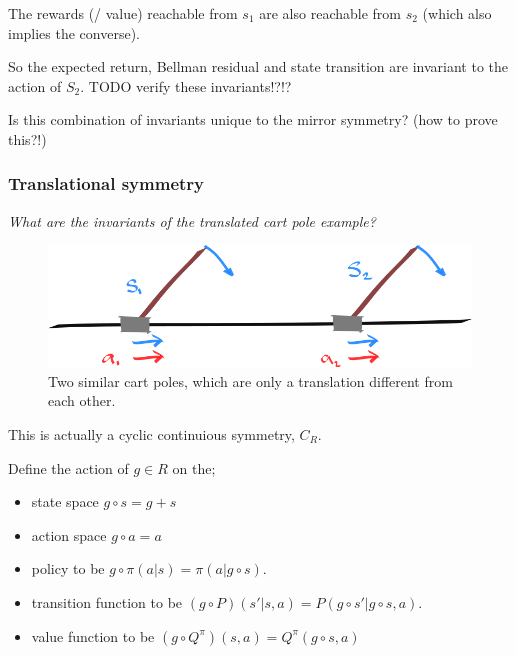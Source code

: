 The rewards (/ value) reachable from $s_1$ are also reachable from $s_2$ (which also implies the converse).

So the expected return, Bellman residual and state transition are invariant to the action of $S_2$.
{\color{red}TODO verify these invariants!?!?}

Is this combination of invariants unique to the mirror symmetry? (how to prove this?!)

\subsubsection{Translational symmetry}

\begin{displayquote}
\textit{What are the invariants of the translated cart pole example?}
\end{displayquote}

\begin{figure}[h!]
\centering
\includegraphics[width=1\textwidth,height=0.25\textheight]{../../pictures/drawings/cart-pole-translation.png}
\caption{Two similar cart poles, which are only a translation different from each other.}
\end{figure}

This is actually a cyclic continuious symmetry, $C_R$.


Define the action of $g \in R$ on the;

\begin{itemize}
	\tightlist
	\item state space $g \circ s = g+s$
	\item action space $g \circ a = a$
 	\item policy to be $g \circ \pi(a | s) = \pi(a | g \circ s)$.
	\item transition function to be $(g \circ P)(s' | s, a) = P(g \circ  s'| g \circ  s,  a)$.
	\item value function to be $(g \circ  Q^{\pi})(s, a) = Q^\pi(g \circ  s,  a)$
\end{itemize}

